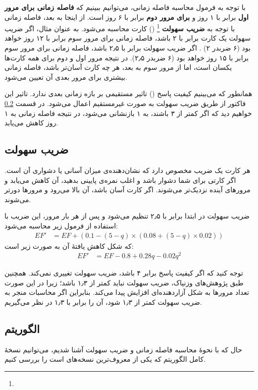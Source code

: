 \documentclass[12pt]{report}
\begin{document}
با توجه به فرمول محاسبه فاصله زمانی، می‌توانیم ببینیم که 
\textbf{فاصله زمانی برای مرور اول} برابر با ۱ روز و 
\textbf{برای مرور دوم} برابر با ۶ روز است. از اینجا به بعد، فاصله زمانی با توجه به 
\textbf{ضریب سهولت}
\footnote{}
()
کارت محاسبه می‌شود. به عنوان مثال، اگر ضریب سهولت یک کارت برابر با ۲ باشد، فاصله زمانی برای 
مرور سوم برابر با ۱۲ روز خواهد بود (۶ ضربدر ۲)
. اگر ضریب سهولت برابر با ۲٫۵ باشد، فاصله زمانی برای مرور سوم برابر با ۱۵ روز خواهد بود (۶ ضربدر ۲٫۵).
در نتیجه مرور اول و دوم برای همه کارت‌ها یکسان است، اما از مرور سوم به بعد، 
هر چه کارت آسان‌تر باشد، فاصله زمانی بیشتری برای مرور بعدی آن تعیین می‌شود.


همانطور که می‌بینیم
کیفیت پاسخ
()
تاثیر مستقیمی بر
بازه زمانی بعدی ندارد.
تاثیر این فاکتور از طریق
ضریب سهولت
به صورت غیرمستقیم اعمال می‌شود.
در قسمت
\ref{sec:sm-alg}
خواهیم دید که اگر  کمتر از ۳ باشند،
 به ۱ بازنشانی می‌شود،
 در نتیجه فاصله زمانی به ۱ روز کاهش می‌یابد.


\subsection{ضریب سهولت}
هر کارت یک ضریب مخصوص دارد که نشان‌دهنده‌ی میزان آسانی یا دشواری آن است.
 اگر کارتی برای شما دشوار باشد و اغلب نمره‌ی پایینی بدهید، 
  آن کاهش می‌یابد و مرورهای آینده نزدیک‌تر می‌شوند. اگر کارت آسان باشد، 
  آن بالا می‌رود و مرورها دورتر می‌شوند.

ضریب سهولت
در ابتدا برابر با ۲٫۵ تنظیم می‌شود و
 پس از هر بار مرور، این ضریب
 با استفاده از فرمول زیر محاسبه می‌شود:
\begin{align}
    EF' &= EF + (0.1 - (5-q) \times (0.08 + (5-q) \times 0.02))
\end{align}
که شکل کاهش یافتهٔ آن به صورت زیر است:
\begin{align}
    EF' &= EF - 0.8 + 0.28q - 0.02q^2\label{eq:ef-update}
\end{align}

توجه کنید که اگر کیفیت پاسخ برابر ۴ باشد، ضریب سهولت تغییری نمی‌کند.
همچنین طبق پژوهش‌های وزنیاک، ضریب سهولت نباید کمتر از ۱٫۳ باشد؛
زیرا در این صورت تعداد مرورها به شکل آزاردهنده‌ای افزایش پیدا می‌کند.
بنابراین اگر محاسبات منجر به ضریب سهولت کمتر از ۱٫۳ شود،
آن را برابر با ۱٫۳ در نظر می‌گیریم.

\subsection{الگوریتم }\label{sec:sm-alg}
حال که با نحوهٔ محاسبه فاصله زمانی و ضریب سهولت آشنا شدیم،
می‌توانیم نسخهٔ کامل الگوریتم
که یکی از معروف‌ترین نسخه‌های  است را بررسی کنیم.
\end{document}
